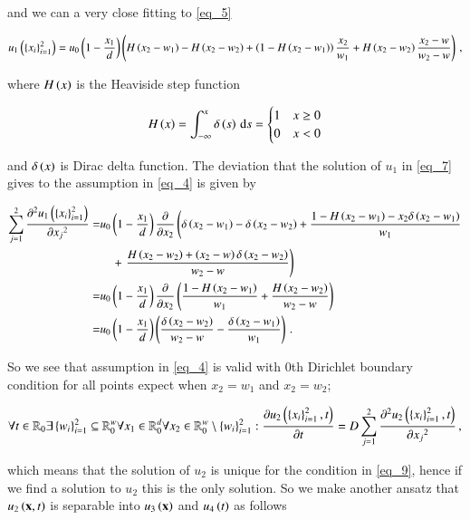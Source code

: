 \documentclass[11pt,english,a4paper]{article}
\begin{document}
\begin{flushleft}
and we can a very close fitting to \eqref{eq_5} 

\begin{align}
u_1\left({\left\lbrace{x_i}\right\rbrace_{i=1}^2}\right) = u_0\left({1-\frac{x_1}{d}}\right)\left({H\left({x_2-w_1}\right)-H\left({x_2-w_2}\right) + \left({1-H\left({x_2-w_1}\right)}\right)\frac{x_2}{w_1} + H\left({x_2-w_2}\right)\frac{x_2-w}{w_2-w}}\right) \,,
\label{eq_7}
\end{align}

where $H\left({x}\right)$ is the Heaviside step function

\begin{align*}
H\left({x}\right) = \int_{-\infty}^x \delta\left({s}\right)\,\mathrm{d}s = \begin{cases} 1 & x \geq 0 \\ 0 & x < 0 \end{cases}
\end{align*}

and $\delta\left({x}\right)$ is Dirac delta function. The deviation that the solution of $u_1$ in \eqref{eq_7} gives to the assumption in \eqref{eq_4} is given by

\begin{align}
\sum_{j=1}^2 \frac{\partial ^2 u_1\left({\left\lbrace{x_i}\right\rbrace_{i=1}^2}\right)}{\partial {x_j}^2} 
=& u_0\left({1-\frac{x_1}{d}}\right)\frac{\partial}{\partial x_2}\left(\delta\left({x_2-w_1}\right)-\delta\left({x_2-w_2}\right) +\frac{1-H\left({x_2-w_1}\right) -x_2\delta\left({x_2-w_1}\right)}{w_1} \right.
\nonumber\\
&\quad + \left. \frac{H\left({x_2-w_2}\right)+\left({x_2-w}\right)\delta\left({x_2-w_2}\right)}{w_2-w}\right)
\nonumber\\
=& u_0\left({1-\frac{x_1}{d}}\right)\frac{\partial}{\partial x_2}\left({\frac{1-H\left({x_2-w_1}\right)}{w_1} + \frac{H\left({x_2-w_2}\right)}{w_2-w}}\right)
\nonumber\\
=& u_0\left({1-\frac{x_1}{d}}\right)\left({\frac{\delta\left({x_2-w_2}\right)}{w_2-w} - \frac{\delta\left({x_2-w_1}\right)}{w_1}}\right) \,.
\label{eq_8}
\end{align}

So we see that assumption in \eqref{eq_4} is valid with 0th Dirichlet boundary condition for all points expect when $x_2=w_1$ and $x_2=w_2$;

\begin{align}
\forall t\in \mathbb{R}_0\exists\left\lbrace{w_i}\right\rbrace_{i=1}^2\subseteq \mathbb{R}_0^w \forall x_1\in \mathbb{R}_{0}^d \forall x_2\in\mathbb{R}_0^w \setminus \left\lbrace{w_i}\right\rbrace_{i=1}^2 : \frac{\partial u_2\left({\left\lbrace{x_i}\right\rbrace_{i=1}^2,t}\right)}{\partial t} = D\sum_{j=1}^2\frac{\partial^2 u_2\left({\left\lbrace{x_i}\right\rbrace_{i=1}^2,t}\right)}{\partial {x_j}^2} \,,
\label{eq_9}
\end{align}

which means that the solution of $u_2$ is unique for the condition in \eqref{eq_9}, hence if we find a solution to $u_2$ this is the only solution. So we make another ansatz that $u_2\left({\textbf{x},t}\right)$ is separable into $u_3\left({\textbf{x}}\right)$ and $u_4\left({t}\right)$ as follows


\end{flushleft}
\end{document}
